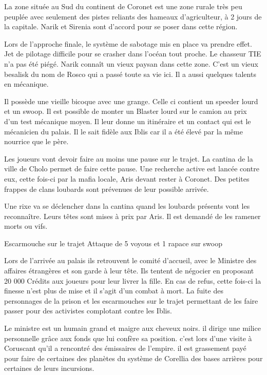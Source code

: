 \documentclass[a4paper,10pt,twoside,twocolumn,openany]{book}
\begin{document}
La zone située au Sud du continent de Coronet est une zone rurale très peu peuplée avec
seulement des pistes reliants des hameaux d’agriculteur, à 2 jours de la capitale. Narik et
Sirenia sont d'accord pour se poser dans cette région.

Lors de l'approche finale, le système de sabotage mis en place va prendre effet. Jet de pilotage
difficile pour se crasher dans l'océan tout proche. Le chasseur TIE n'a pas été piégé.
Narik connaît un vieux paysan dans cette zone. C’est un vieux besalisk du nom de Rosco qui a
passé toute sa vie ici. Il a aussi quelques talents en mécanique.

Il possède une vieille bicoque avec une grange. Celle ci contient un speeder lourd et un swoop.
Il est possible de monter un Blaster lourd sur le camion au prix d'un test mécanique moyen.
Il leur donne un itinéraire et un contact qui est le mécanicien du palais. Il le sait fidèle aux Iblis
car il a été élevé par la même nourrice que le père.

Les joueurs vont devoir faire au moins une pause sur le trajet. La cantina de la ville de Cholo
permet de faire cette pause. Une recherche active est lancée contre eux, cette fois-ci par la
mafia locale, Aris devant rester à Coronet. Des petites frappes de clans loubards sont
prévenues de leur possible arrivée.

Une rixe va se déclencher dans la cantina quand les loubards présents vont les reconnaître.
Leurs têtes sont mises à prix par Aris. Il est demandé de les ramener morts ou vifs.

\begin{commentbox}{Escarmouche sur le trajet}
Attaque de 5 voyous et 1 rapace sur swoop
\end{commentbox}

Lors de l'arrivée au palais ils retrouvent le comité d'accueil, avec le Ministre des affaires
étrangères et son garde à leur tête. Ils tentent de négocier en proposant 20 000 Crédits aux
joueurs pour leur livrer la fille. En cas de refus, cette fois-ci la finesse n’est plus de mise et il
s’agit d’un combat à mort. La fuite des personnages de la prison et les escarmouches sur le
trajet permettant de les faire passer pour des activistes complotant contre les Iblis.

Le ministre est un humain grand et maigre aux cheveux noirs. il dirige une milice personnelle
grâce aux fonds que lui confère sa position. c'est lors d'une visite à Coruscant qu'il a rencontré
des émissaires de l'empire. il est grassement payé pour faire de certaines des planètes du
système de Corellia des bases arrières pour certaines de leurs incursions.
\end{document}
